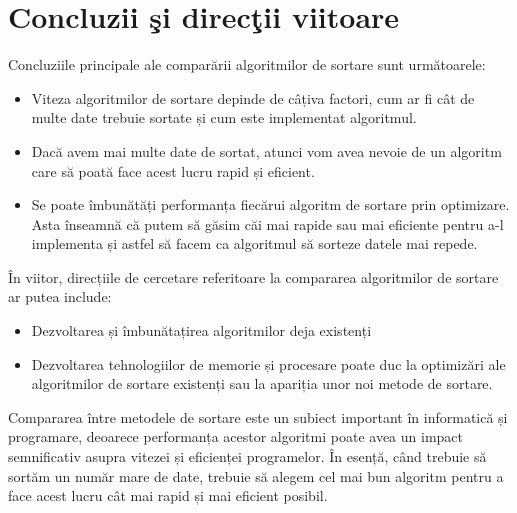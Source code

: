 \documentclass[12pt]{article}
\begin{document}
\section{Concluzii şi direcţii viitoare}
Concluziile principale ale comparării algoritmilor de sortare sunt următoarele:
\begin{itemize}
    \item Viteza algoritmilor de sortare depinde de câțiva factori, cum ar fi cât de multe date trebuie sortate și cum este implementat algoritmul.
    \item  Dacă avem mai multe date de sortat, atunci vom avea nevoie de un algoritm care să poată face acest lucru rapid și eficient.

\item  Se poate îmbunătăți performanța fiecărui algoritm de sortare prin optimizare. Asta înseamnă că putem să găsim căi mai rapide sau mai eficiente pentru a-l implementa și astfel să facem ca algoritmul să sorteze datele mai repede.
\end{itemize}
În viitor, direcțiile de cercetare referitoare la compararea algoritmilor de sortare ar putea include:
\begin{itemize}
    \item Dezvoltarea și îmbunătațirea algoritmilor deja existenți
    \item Dezvoltarea tehnologiilor de memorie și procesare poate duc la optimizări ale algoritmilor de sortare existenți sau la apariția unor noi metode de sortare.
\end{itemize}
Compararea între metodele de sortare este un subiect important în informatică și programare, deoarece performanța acestor algoritmi poate avea un impact semnificativ asupra vitezei și eficienței programelor. În esență, când trebuie să sortăm un număr mare de date, trebuie să alegem cel mai bun algoritm pentru a face acest lucru cât mai rapid și mai eficient posibil.

\pagebreak


\end{document}

